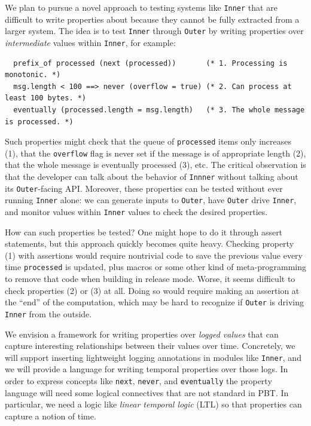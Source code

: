 We plan to pursue a novel approach to testing systems like
\lstinline{Inner} that are
difficult to write properties about because they cannot be fully extracted from
a larger system.
The idea is to test
\lstinline{Inner} through \lstinline{Outer} by
writing properties over {\em intermediate} values within
\lstinline{Inner}, for example:
\begin{lstlisting}
  prefix_of processed (next (processed))       (* 1. Processing is monotonic. *)
  msg.length < 100 ==> never (overflow = true) (* 2. Can process at least 100 bytes. *)
  eventually (processed.length = msg.length)   (* 3. The whole message is processed. *)
\end{lstlisting}
Such properties might check that the queue of \lstinline{processed} items only
increases (1), that the \lstinline{overflow} flag is never set if the message is
of appropriate length (2), that the whole message is eventually processed (3),
etc.  The critical observation is that the developer can talk about the behavior
of \lstinline{Innner} without talking about its \lstinline{Outer}-facing API.
Moreover, these properties can be tested without ever running
\lstinline{Inner} alone: we can generate inputs to \lstinline{Outer}, have
\lstinline{Outer} drive \lstinline{Inner}, and monitor values within
\lstinline{Inner} values to check the desired properties.

How can such properties be tested?  One might
hope to do it through assert statements, but this approach quickly
becomes quite heavy.
Checking property (1) with assertions would require nontrivial code to
save the previous value every time \lstinline{processed} is updated, plus
macros or some other kind of meta-programming to
remove that code when building in release mode. Worse, it seems difficult
to check properties (2) or (3) at all. Doing so would require making an
assertion at the ``end'' of the computation, which may be hard to
recognize if \lstinline{Outer} is driving \lstinline{Inner} from the
outside.

We envision a framework for writing properties over {\em logged values}
that can capture interesting relationships between their values
over time.  Concretely, we will support inserting lightweight
logging annotations in modules like \lstinline{Inner}, and we will
provide a language for writing temporal properties over those
logs. In order to express concepts like \lstinline{next}, \lstinline{never}, and
\lstinline{eventually} the property language will need some logical connectives
that are not standard in PBT.  In particular, we need a logic like {\em
linear temporal logic} (LTL) so that properties can capture a notion of time.

